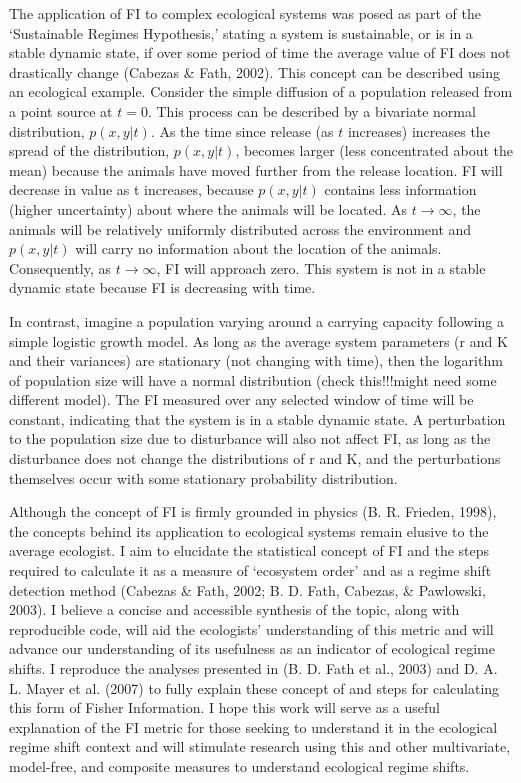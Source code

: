 \documentclass[12pt,twoside,openany]{reedthesis}
\begin{document}
The application of FI to complex ecological systems was posed as part of
the `Sustainable Regimes Hypothesis,' stating a system is sustainable,
or is in a stable dynamic state, if over some period of time the average
value of FI does not drastically change (Cabezas \& Fath, 2002). This
concept can be described using an ecological example. Consider the
simple diffusion of a population released from a point source at
\(t = 0\). This process can be described by a bivariate normal
distribution, \(p(x,y\vert t)\). As the time since release (as \(t\)
increases) increases the spread of the distribution, \(p(x,y\vert t)\),
becomes larger (less concentrated about the mean) because the animals
have moved further from the release location. FI will decrease in value
as t increases, because \(p(x,y\vert t)\) contains less information
(higher uncertainty) about where the animals will be located. As
\(t \rightarrow \infty\), the animals will be relatively uniformly
distributed across the environment and \(p(x,y\vert t)\) will carry no
information about the location of the animals. Consequently, as
\(t \rightarrow \infty\), FI will approach zero. This system is not in a
stable dynamic state because FI is decreasing with time.

In contrast, imagine a population varying around a carrying capacity
following a simple logistic growth model. As long as the average system
parameters (r and K and their variances) are stationary (not changing
with time), then the logarithm of population size will have a normal
distribution (check this!!!might need some different model). The FI
measured over any selected window of time will be constant, indicating
that the system is in a stable dynamic state. A perturbation to the
population size due to disturbance will also not affect FI, as long as
the disturbance does not change the distributions of r and K, and the
perturbations themselves occur with some stationary probability
distribution.

Although the concept of FI is firmly grounded in physics (B. R. Frieden,
1998), the concepts behind its application to ecological systems remain
elusive to the average ecologist. I aim to elucidate the statistical
concept of FI and the steps required to calculate it as a measure of
`ecosystem order' and as a regime shift detection method (Cabezas \&
Fath, 2002; B. D. Fath, Cabezas, \& Pawlowski, 2003). I believe a
concise and accessible synthesis of the topic, along with reproducible
code, will aid the ecologists' understanding of this metric and will
advance our understanding of its usefulness as an indicator of
ecological regime shifts. I reproduce the analyses presented in (B. D.
Fath et al., 2003) and D. A. L. Mayer et al. (2007) to fully explain
these concept of and steps for calculating this form of Fisher
Information. I hope this work will serve as a useful explanation of the
FI metric for those seeking to understand it in the ecological regime
shift context and will stimulate research using this and other
multivariate, model-free, and composite measures to understand
ecological regime shifts.
\end{document}
